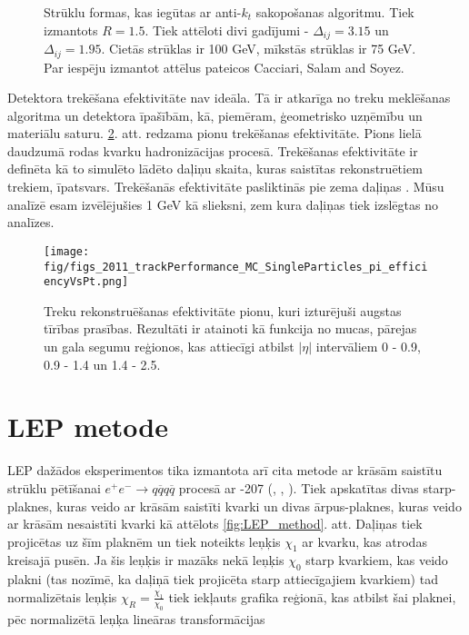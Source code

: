 \begin{figure}[hbtp]
  \def\twidth{0.5}
   \caption{Strūklu formas, kas iegūtas ar anti-$k_{t}$ sakopošanas algoritmu. Tiek izmantots $R=1.5$. Tiek attēloti divi gadījumi - $\Delta_{ij}=3.15$ un  $\Delta_{ij}=1.95$. Cietās strūklas \pt ir 100 GeV, mīkstās strūklas \pt ir 75 GeV. Par iespēju izmantot attēlus pateicos Cacciari, Salam and Soyez.}
  \label{fig:anti_kt}
\end{figure}

Detektora trekēšana efektivitāte nav ideāla. Tā ir atkarīga no treku meklēšanas algoritma un detektora īpašībām, kā, piemēram, ģeometrisko \gls{uzņēmību} un materiālu saturu. \ref{fig:2011_trackPerformance_MC_SingleParticles_pi_efficiencyVsPt}. att. redzama pionu trekēšanas efektivitāte. Pions  lielā daudzumā rodas kvarku hadronizācijas procesā. Trekēšanas efektivitāte ir definēta kā to simulēto lādēto daļiņu skaita, kuras saistītas rekonstruētiem trekiem, īpatsvars. Trekēšanās efektivitāte pasliktinās pie zema daļiņas \pt. Mūsu analīzē esam izvēlējušies  1 GeV kā \pt slieksni, zem kura daļiņas tiek izslēgtas no analīzes.

\begin{figure}[hbtp]
    \texttt{[image: fig/figs\_2011\_trackPerformance\_MC\_SingleParticles\_pi\_efficiencyVsPt.png]}
    \caption{Treku rekonstruēšanas efektivitāte pionu, kuri izturējuši augstas tīrības prasības. Rezultāti ir atainoti kā funkcija no \pt mucas, pārejas un gala segumu reģionos, kas attiecīgi atbilst $\left|\eta\right|$ intervāliem 0 - 0.9, 0.9 - 1.4 un 1.4 - 2.5. \cite{Chatrchyan:2014fea}}
    \label{fig:2011_trackPerformance_MC_SingleParticles_pi_efficiencyVsPt}
\end{figure}

\section{LEP metode}

LEP dažādos eksperimentos tika izmantota arī cita metode ar krāsām saistītu strūklu pētīšanai $e^{+}e^{-}\rightarrow q\overline{q}q\overline{q}$ procesā ar -207 \GeV (\cite{Abdallah:2006uq}, \cite{Abbiendi:2005es}, \cite{Achard:2003pe}). Tiek apskatītas divas starp-\PW plaknes, kuras veido ar krāsām saistīti kvarki un divas ārpus-\PW plaknes, kuras veido ar krāsām nesaistīti kvarki kā attēlots \ref{fig:LEP_method}. att. Daļiņas tiek projicētas uz šīm plaknēm un tiek noteikts leņķis $\chi_{1}$ ar kvarku, kas atrodas kreisajā pusēn. Ja šis leņķis ir mazāks nekā leņķis $\chi_{0}$ starp kvarkiem, kas veido plakni (tas nozīmē, ka daļiņā tiek projicēta starp attiecīgajiem kvarkiem) tad normalizētais leņķis $\chi_{R}=\frac{\chi_{1}}{\chi_{0}}$ tiek iekļauts grafika reģionā, kas atbilst šai plaknei, pēc normalizētā leņķa lineāras transformācijas

